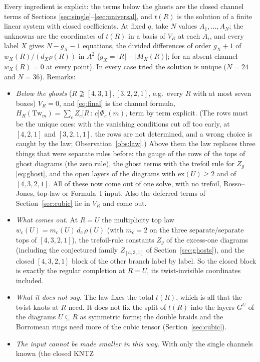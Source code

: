 \documentclass[11pt]{article}
\newcommand{\Tw}{\mathrm{Tw}}
\newcommand{\cf}[2]{\bigl[#1\,{:}\,#2\bigr]}
\begin{document}
Every ingredient is explicit: the terms below the ghosts are the closed channel terms of Sections
\ref{sec:single}--\ref{sec:universal}, and $t(R)$ is the solution of a finite linear system with closed coefficients.
At fixed $q$, take $N$ values $A_1,\dots,A_N$; the unknowns are the coordinates of $t(R)$ in a basis of $V_R$ at each
$A_i$, and every label $X$ gives $N-g_X-1$ equations, the divided differences of order $g_X+1$ of
$w_X(R)/(d_X\rho(R))$ in $A^2$ ($g_X=|R|-|M_X(R)|$; for an absent channel $w_X(R)=0$ at every point).  In every case
tried the solution is unique ($N=24$ and $N=36$).  Remarks:
\begin{itemize}
\item[(a)] \emph{Below the ghosts} ($R\not\supseteq[4,3,1],[3,2,2,1]$, e.g.\ every $R$ with at most seven boxes) $V_R=0$, and
\eqref{eq:final} is the channel formula, $H_R(\Tw_m)=\sum_cZ_c\cf Rc\Phi_c(m)$, term by term explicit.  (The rows must be
the unique ones: with the vanishing conditions cut off too early, at $[4,2,1]$ and $[3,2,1,1]$, the rows are not
determined, and a wrong choice is caught by the law; Observation~\ref{obs:law}.)  Above them the law
replaces three things that were separate rules before: the gauge of the rows of the tops of ghost diagrams (the zero
rule), the ghost terms with the trefoil rule for $Z_g$ \eqref{eq:ghost}, and the open layers of the diagrams with
$\mathrm{ex}(U)\ge2$ and of $[4,3,2,1]$.  All of these now come out of one solve, with no trefoil, Rosso--Jones, top-law or
Formula~I input.  Also the deferred terms of Section~\ref{sec:cubic} lie in $V_R$ and come out.
\item[(b)] \emph{What comes out.}  At $R=U$ the multiplicity top law $w_c(U)=m_c(U)\,d_c\,\rho(U)$ (with $m_c=2$ on the three
separate/separate tops of $[4,3,2,1]$), the trefoil-rule constants $Z_g$ of the excess-one diagrams (including the
conjectured family $Z_{[a,3,1]}$ of Section~\ref{sec:ghosts}), and the closed $[4,3,2,1]$ block of the other branch
label by label.  So the closed block is exactly the regular completion at $R=U$, its twist-invisible coordinates
included.
\item[(c)] \emph{What it does not say.}  The law fixes the total $t(R)$, which is all that the twist knots at $R$ need.  It
does not fix the split of $t(R)$ into the layers $G^U$ of the diagrams $U\subseteq R$ as symmetric forms; the double braids
and the Borromean rings need more of the cubic tensor (Section~\ref{sec:cubic}).
\item[(d)] \emph{The input cannot be made smaller in this way.}  With only the single channels known (the closed KNTZ

\end{itemize}
\end{document}
